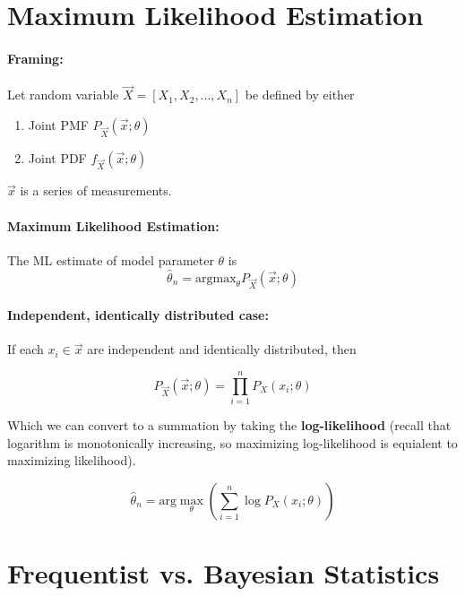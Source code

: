 \documentclass[a4paper,12pt]{report}
\begin{document}
\section{Maximum Likelihood Estimation}

\paragraph{Framing: } Let random variable $\vec X = [X_1, X_2, ..., X_n]$ be defined by either
\begin{enumerate}
\item Joint PMF $P_{\vec X}(\vec x; \theta)$
\item Joint PDF $f_{\vec X}(\vec x; \theta)$
\end{enumerate}

$\vec x$ is a series of measurements. 

\paragraph{Maximum Likelihood Estimation: } The ML estimate of model parameter $\theta$ is
\begin{equation}
\hat \theta_n = \text{argmax}_\theta P_{\vec X}(\vec x; \theta)
\end{equation}

\paragraph{Independent, identically distributed case: } If each $x_i\in\vec x$ are independent and identically distributed, then

\begin{equation}
P_{\vec X}(\vec x; \theta) = \prod_{i=1}^n P_{X}(x_i; \theta)
\end{equation}

Which we can convert to a summation by taking the \textbf{log-likelihood} (recall that logarithm is monotonically increasing, so maximizing log-likelihood is equialent to maximizing likelihood).

\begin{equation}
\hat\theta_n = \text{arg}\max_{\theta} (\sum_{i=1}^{n} \log P_X(x_i; \theta))
\end{equation}


\section{Frequentist vs. Bayesian Statistics}
\end{document}
